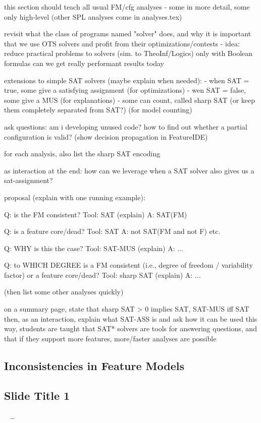 this section should teach all usual FM/cfg analyses - some in more detail, some only high-level (other SPL analyses come in analyses.tex)

revisit what the class of programs named "solver" does, and why it is important that we use OTS solvers and profit from their optimizations/contests - idea: reduce practical problems to solvers (sim. to TheoInf/Logics)
only with Boolean formulas can we get really performant results today

extensions to simple SAT solvers (maybe explain when needed):
- when SAT = true, some give a satisfying assignment (for optimizations)
- wen SAT = false, some give a MUS (for explanations)
- some can count, called sharp SAT (or keep them completely separated from SAT?) (for model counting)

ask questions:
am i developing unused code?
how to find out whether a partial configuration is valid? (show decision propagation in FeatureIDE)

for each analysis, also list the sharp SAT encoding

as interaction at the end: how can we leverage when a SAT solver also gives us a sat-assignment?

proposal (explain with one running example):

Q: is the FM consistent?
Tool: SAT (explain)
A: SAT(FM)

Q: is a feature core/dead?
Tool: SAT
A: not SAT(FM and not F) etc.

Q: WHY is this the case?
Tool: SAT-MUS (explain)
A: ...

Q: to WHICH DEGREE is a FM consistent (i.e., degree of freedom / variability factor) or a feature core/dead?
Tool: sharp SAT (explain)
A: ...

(then list some other analyses quickly)

on a summary page, state that sharp SAT > 0 implies SAT, SAT-MUS iff SAT
then, as an interaction, explain what SAT-ASS is and ask how it can be used
this way, students are taught that SAT* solvers are tools for answering questions, and that if they support more features, more/faster analyses are possible



\subsection{Inconsistencies in Feature Models}

\subsection{Slide Title 1}
\begin{frame}{~}
	\ldots
\end{frame}

